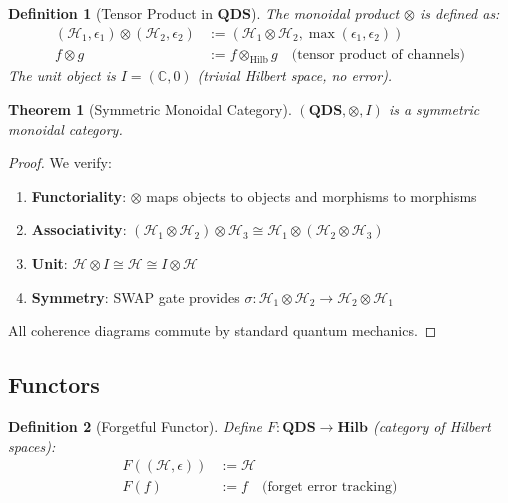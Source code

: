 \documentclass[11pt]{article}
\newtheorem{theorem}{Theorem}
\newtheorem{definition}{Definition}
\begin{document}
\begin{definition}[Tensor Product in $\mathbf{QDS}$]
The monoidal product $\otimes$ is defined as:
\begin{align}
(\mathcal{H}_1, \epsilon_1) \otimes (\mathcal{H}_2, \epsilon_2) &:= (\mathcal{H}_1 \otimes \mathcal{H}_2, \max(\epsilon_1, \epsilon_2)) \\
f \otimes g &:= f \otimes_{\text{Hilb}} g \quad \text{(tensor product of channels)}
\end{align}
The unit object is $I = (\mathbb{C}, 0)$ (trivial Hilbert space, no error).
\end{definition}

\begin{theorem}[Symmetric Monoidal Category]
\label{thm:monoidal}
$(\mathbf{QDS}, \otimes, I)$ is a symmetric monoidal category.
\end{theorem}

\begin{proof}
We verify:
\begin{enumerate}
\item \textbf{Functoriality}: $\otimes$ maps objects to objects and morphisms to morphisms
\item \textbf{Associativity}: $(\mathcal{H}_1 \otimes \mathcal{H}_2) \otimes \mathcal{H}_3 \cong \mathcal{H}_1 \otimes (\mathcal{H}_2 \otimes \mathcal{H}_3)$
\item \textbf{Unit}: $\mathcal{H} \otimes I \cong \mathcal{H} \cong I \otimes \mathcal{H}$
\item \textbf{Symmetry}: SWAP gate provides $\sigma : \mathcal{H}_1 \otimes \mathcal{H}_2 \to \mathcal{H}_2 \otimes \mathcal{H}_1$
\end{enumerate}
All coherence diagrams commute by standard quantum mechanics.
\end{proof}

\subsection{Functors}

\begin{definition}[Forgetful Functor]
Define $F : \mathbf{QDS} \to \mathbf{Hilb}$ (category of Hilbert spaces):
\begin{align}
F((\mathcal{H}, \epsilon)) &:= \mathcal{H} \\
F(f) &:= f \quad \text{(forget error tracking)}
\end{align}
\end{definition}
\end{document}
